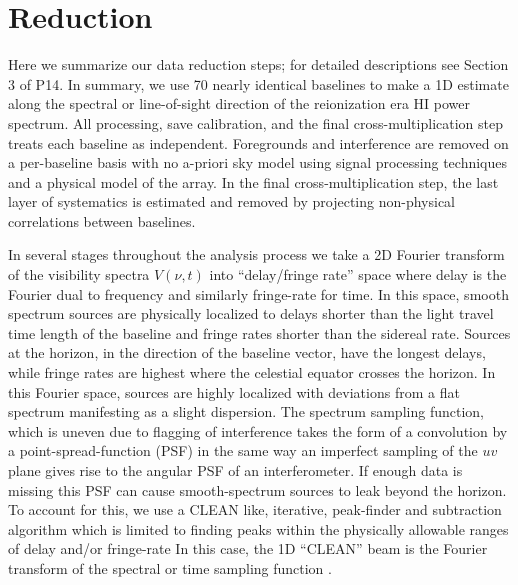 \documentclass[preprint]{aastex}
\begin{document}
\section{Reduction}
\label{sec:obs_meth}
Here we summarize our data reduction steps; for detailed descriptions see Section 3 of P14.  In summary, we use 70 nearly identical baselines to make a 1D estimate along the spectral or line-of-sight direction of the reionization era HI power spectrum.  All processing, save calibration, and  the final cross-multiplication step treats each baseline as independent. Foregrounds and interference are removed on a per-baseline basis with no a-priori sky model using signal processing techniques and a physical model of the array. In the final cross-multiplication step, the last layer of systematics is estimated and removed by projecting non-physical correlations between baselines.

In several stages throughout the analysis process we take a 2D Fourier transform of the visibility spectra $V(\nu,t)$ into ``delay/fringe rate'' space where delay is the Fourier dual to frequency and similarly fringe-rate for time.  In this space, smooth spectrum sources are physically localized to delays shorter than the light travel time length of the baseline and fringe rates shorter than the sidereal rate. Sources at the horizon, in the direction of the baseline vector, have the longest delays, while fringe rates are highest where the celestial equator crosses the horizon. %
 In this Fourier space, sources are highly localized with deviations from a flat spectrum manifesting as a slight dispersion. The spectrum sampling function, which is uneven due to flagging of interference takes the form of a convolution by a point-spread-function (PSF) in the same way an imperfect sampling of the $uv$ plane gives rise to the angular PSF of an interferometer.  If enough data is missing this PSF can cause smooth-spectrum sources to leak beyond the horizon.  To account for this, we use a CLEAN like, iterative, peak-finder and subtraction algorithm which is limited to finding peaks within the physically allowable ranges of delay and/or fringe-rate In this case, the 1D ``CLEAN'' beam is the Fourier transform of the spectral or time sampling function \citep{Parsons:2009p7859}.
\end{document}
